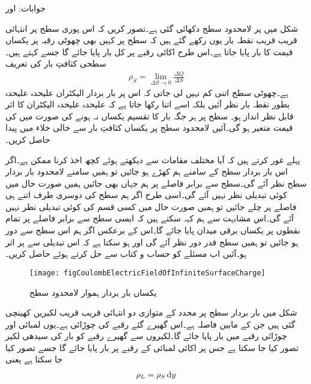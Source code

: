 جوابات: اور 

شکل  میں   پر لامحدود  سطح دکھائی گئی ہے۔تصور کریں کہ اس پوری  سطح پر انتہائی قریب قریب نقطہ بار یوں رکھے گئے ہیں کہ سطح پر کہیں بھی چھوٹی رقبہ  پر  یکساں قیمت کا بار  پایا جاتا ہے۔اس طرح اکائی رقبے پر کل  بار پایا جائے گا جسے   کہتے ہیں۔سطحی کثافتِ بار کی تعریف
\begin{align}\label{مساوات_کولمب_سطحی_کثافت_تعریف}
\rho_S=\lim_{\Delta S \to 0}\frac{\Delta Q}{\Delta S}
\end{align}
ہے۔چھوٹی سطح اتنی کم نہیں لی جاتی کہ اس پر بار بردار الیکٹران علیحدہ علیحدہ بطور نقطہ بار نظر آئیں بلکہ اسے اتنا رکھا جاتا ہے کہ علیحدہ علیحدہ الیکٹران کا اثر قابل نظر انداز ہو۔ سطح پر ہر جگہ بار کا تقسیم یکساں نہ ہونے کی صورت میں  کی قیمت متغیر ہو گی۔آئیں لامحدود سطح پر یکساں کثافتِ بار سے خالی خلاء میں  پیدا  حاصل کریں۔

پہلے غور کرتے ہیں کہ آیا مختلف مقامات سے  دیکھتے ہوئے کچھ اخذ کرنا ممکن ہے۔اگر اس بار بردار سطح کے سامنے ہم کھڑے ہو جائیں تو ہمیں سامنے لامحدود بار بردار سطح نظر آئے گی۔سطح سے برابر فاصلے پر ہم جہاں بھی جائیں ہمیں صورت حال میں کوئی تبدیلی نظر نہیں آئے گی۔اسی طرح اگر ہم سطح کی دوسری طرف اتنے ہی فاصلے پر چلے جائیں تو ہمیں صورت حال میں کسی قسم کی کوئی تبدیلی نظر نہیں آئے گی۔اس مشابہت سے ہم کہہ سکتے ہیں کہ ایسی سطح سے برابر فاصلے پر تمام نقطوں  پر یکساں برقی میدان پایا جائے گا۔اس کے برعکس اگر ہم اس سطح سے دور ہو جائیں تو ہمیں سطح قدر دور نظر آئے گی اور ہو سکتا ہے کہ اس تبدیلی سے  پر اثر ہو۔آئیں اب مسئلے کو حساب و کتاب سے حل کرتے ہوئے  حاصل کریں۔
\begin{figure}
\centering
\texttt{[image: figCoulombElectricFieldOfInfiniteSurfaceCharge]}
\caption{یکساں بار بردار ہموار لامحدود سطح}
\label{شکل_کولمب_لامحدود_سطح_پر_بار}
\end{figure}

شکل   میں بار بردار سطح پر   محدد کے متوازی دو انتہائی قریب قریب لکیریں کھینچی گئی ہیں جن کے مابین فاصلہ  ہے۔اس گھیرے گئے رقبے کی چوڑائی  ہے۔یوں  لمبائی اور  چوڑائی رقبے میں  بار پایا جائے گا۔لکیروں سے گھیرے رقبے کو بار کی سیدھی لکیر تصور کیا جا سکتا ہے جس پر اکائی لمبائی کے رقبے پر  بار پایا جائے گا جسے  تصور کیا جا سکتا ہے یعنی
\begin{align}
\rho_L=\rho_S \dif y
\end{align}

